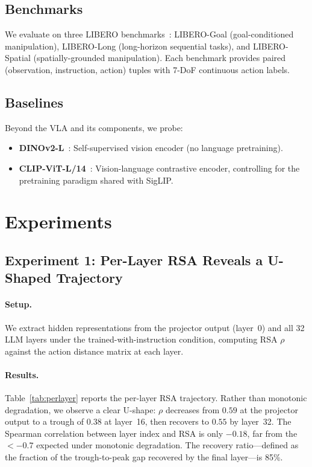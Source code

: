 \documentclass[letterpaper]{article}
\begin{document}
\subsection{Benchmarks}

We evaluate on three LIBERO benchmarks~\citep{liu2024libero}: LIBERO-Goal (goal-conditioned manipulation), LIBERO-Long (long-horizon sequential tasks), and LIBERO-Spatial (spatially-grounded manipulation).
Each benchmark provides paired (observation, instruction, action) tuples with 7-DoF continuous action labels.

\subsection{Baselines}

Beyond the VLA and its components, we probe:
\begin{itemize}
  \item \textbf{DINOv2-L}~\citep{oquab2024dinov2}: Self-supervised vision encoder (no language pretraining).
  \item \textbf{CLIP-ViT-L/14}~\citep{radford2021clip}: Vision-language contrastive encoder, controlling for the pretraining paradigm shared with SigLIP.
\end{itemize}


\section{Experiments}
\label{sec:experiments}

\subsection{Experiment 1: Per-Layer RSA Reveals a U-Shaped Trajectory}
\label{sec:exp1}

\paragraph{Setup.}
We extract hidden representations from the projector output (layer~0) and all 32 LLM layers under the trained-with-instruction condition, computing RSA $\rho$ against the action distance matrix at each layer.

\paragraph{Results.}
Table~\ref{tab:perlayer} reports the per-layer RSA trajectory.
Rather than monotonic degradation, we observe a clear U-shape: $\rho$ decreases from $0.59$ at the projector output to a trough of $0.38$ at layer~16, then recovers to $0.55$ by layer~32.
The Spearman correlation between layer index and RSA is only $-0.18$, far from the $<{-0.7}$ expected under monotonic degradation.
The recovery ratio---defined as the fraction of the trough-to-peak gap recovered by the final layer---is 85\%.
\end{document}
